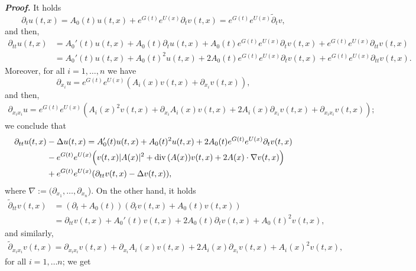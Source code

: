 \documentclass[11pt,reqno]{amsart}
\theoremstyle{definition}
\numberwithin{equation}{section}
\renewenvironment{proof}{\smallskip\noindent\emph{\textbf{Proof.}}%
  \hspace{1pt}}{\hspace{-5pt}{\nobreak\quad\nobreak\hfill\nobreak%
    $\square$\vspace{2pt}\par}\smallskip\goodbreak}
\renewcommand{\div}{\mathinner{\mathop{{\rm div}}}}
\begin{document}
\begin{proof}
It holds 
%
\begin{equation*}
\partial_t u(t,x)=  A_0(t) u(t,x)+e^{G(t)} e^{U(x)} \partial_t v(t,x)=e^{G(t)} e^{U(x)} \tilde\partial_t v, 
\end{equation*}
%
and then,
\begin{align*}
\partial_{tt} u(t,x)&=  A_0'(t)u(t,x)+ A_0(t) \partial_t u(t,x)+ A_0(t)e^{G(t)} e^{U(x)} \partial_t v(t,x)+e^{G(t)} e^{U(x)}\partial_{tt}v(t,x)\\
%
&=  A_0'(t)u(t,x) +  A_0(t)^2 u(t,x)+2  A_0(t) e^{G(t)} e^{U(x)}  \partial_t v(t,x) +e^{G(t)} e^{U(x)}\partial_{tt}v(t,x).
\end{align*}
%
Moreover, for all $i=1, \dots, n$ we have
%
\begin{equation*}
\partial_{x_i} u= e^{G(t)}e^{U(x)}(A_i(x)v(t,x)+\partial_{x_i}v(t,x)),
\end{equation*}
%
and then,
\begin{align*}
\partial_{x_ix_i} u= e^{G(t)}e^{U(x)}(A_i(x)^2v(t,x)+\partial_{x_i} A_i(x)v(t,x)+2 A_i(x)\partial_{x_i}v(t,x)+\partial_{x_ix_i}v(t,x));
\end{align*}
%
we conclude that
%
\begin{equation}
\label{eq:wave_resolution*}
\begin{aligned}
\partial_{tt}u(t,x) &- \Delta u(t,x)=  A_0'(t)u(t,x) +  A_0(t)^2 u(t,x)+2  A_0(t) e^{G(t)}e^{U(x)} \partial_t v(t,x)\\& 
%
-e^{G(t)}e^{U(x)}\Big(v(t,x)| A(x)|^2+\div(A(x))v(t,x)+2  A(x)\cdot \nabla v(t,x)  \Big) \\
%
& +e^{G(t)} e^{U(x)}(\partial_{tt}v(t,x)-\Delta v(t,x)),
\end{aligned}
\end{equation}
where $\nabla:=(\partial_{x_1},\dots, \partial_{x_n}$).
%
On the other hand, it holds 
%
\begin{align*}
\tilde \partial_{tt}v(t,x)&=(\partial_t+ A_0(t))(\partial_t v(t,x)+ A_0(t)v(t,x))\\
%
& =\partial_{tt}v(t,x)+ A_0'(t)v(t,x)+2 A_0(t)\partial_t v(t,x)+ A_0(t)^2 v(t,x),
\end{align*}
%
and similarly, 
%
\begin{align*}
\tilde \partial_{x_i x_i}v(t,x)=\partial_{x_i x_i}v(t,x)+\partial_{x_i}A_i(x)v(t,x)+2A_i(x)\partial_{x_i}v(t,x)+ A_i(x)^2 v(t,x),
\end{align*}
%
for all $i=1,\dots n$; we get
%
\begin{equation*}
\begin{aligned}

\end{aligned}
\end{equation*}
\end{proof}
\end{document}
